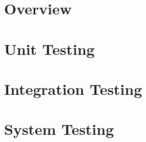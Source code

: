
\newcommand*{\test}{chapters/testing/}

\section{Overview}
	
\section{Unit Testing}
	
\section{Integration Testing}
	
\section{System Testing}
	